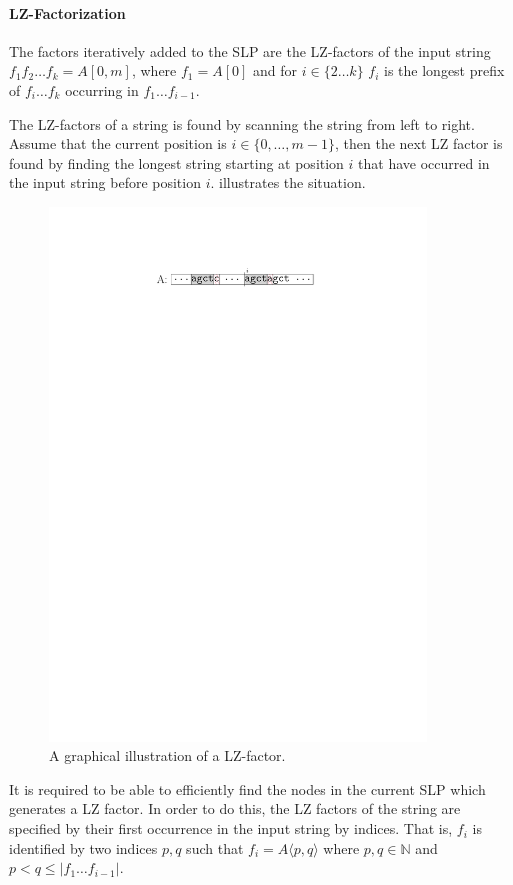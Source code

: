\documentclass[twoside,11pt,openright]{report}
\newcommand{\substr}[3]{#1\langle #2, #3 \rangle}
\newcommand{\str}[3]{#1[#2, #3]}
\begin{document}
\paragraph{LZ-Factorization}
The factors iteratively added to the SLP are the LZ-factors of the input string $f_1 f_2 \dots f_k = \str{A}{0}{m}$, where $f_1 = A[0]$ and for $i \in \{2 \dots k\}$ $f_i$ is the longest prefix of $f_i \dots f_k$ occurring in $f_1 \dots f_{i - 1}$.

The LZ-factors of a string is found by scanning the string from left to right. Assume that the current position is $i \in \{0, \dots, m - 1\}$, then the next LZ factor is found by finding the longest string starting at position $i$ that have occurred in the input string before position $i$.  illustrates the situation.

\begin{figure}[!htb]
  \centering
  \includegraphics[width=10cm]{images/lz-factor}
  \caption{A graphical illustration of a LZ-factor.}
  \label{fig:lz-factor}
\end{figure}

It is required to be able to efficiently find the nodes in the current SLP which generates a LZ factor. In order to do this, the LZ factors of the string are specified by their first occurrence in the input string by indices. That is, $f_i$ is identified by two indices $p, q$ such that $f_i = \substr{A}{p}{q}$ where $p,q \in \mathbb{N}$ and $p < q \leq |f_1 \dots f_{i - 1}|$.
\end{document}
